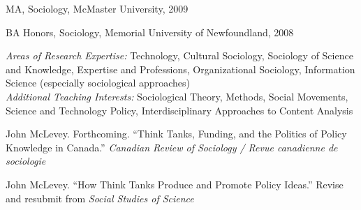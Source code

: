 \documentclass[11pt,usenames,dvipsnames]{article}
\begin{document}

\noindent MA, Sociology, McMaster University, 2009

\noindent BA Honors, Sociology, Memorial University of Newfoundland, 2008 \\



\noindent \emph{Areas of Research Expertise:} Technology, Cultural Sociology, Sociology of Science and Knowledge, Expertise and Professions, Organizational Sociology, Information Science (especially sociological approaches) \\

\noindent \emph{Additional Teaching Interests:} Sociological Theory, Methods, Social Movements, Science and Technology Policy, Interdisciplinary Approaches to Content Analysis \\




\ind John McLevey. Forthcoming. ``Think Tanks, Funding, and the Politics of Policy Knowledge in Canada.'' \emph{Canadian Review of Sociology / Revue canadienne de sociologie}\\



\ind John McLevey. ``How Think Tanks Produce and Promote Policy Ideas.'' Revise and resubmit from \emph{Social Studies of Science}\\
\end{document}
